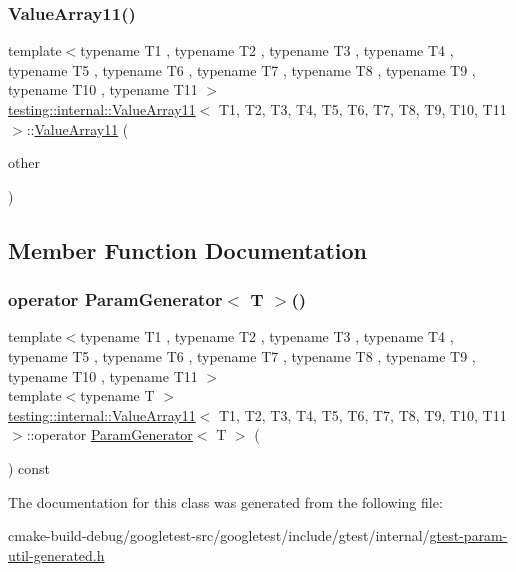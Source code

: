 \subsubsection{\texorpdfstring{ValueArray11()}{ValueArray11()}\hspace{0.1cm}{\footnotesize\ttfamily [2/2]}}
{\footnotesize\ttfamily template$<$typename T1 , typename T2 , typename T3 , typename T4 , typename T5 , typename T6 , typename T7 , typename T8 , typename T9 , typename T10 , typename T11 $>$ \\
\mbox{\hyperlink{classtesting_1_1internal_1_1ValueArray11}{testing\+::internal\+::\+Value\+Array11}}$<$ T1, T2, T3, T4, T5, T6, T7, T8, T9, T10, T11 $>$\+::\mbox{\hyperlink{classtesting_1_1internal_1_1ValueArray11}{Value\+Array11}} (\begin{DoxyParamCaption}\item[{const \mbox{\hyperlink{classtesting_1_1internal_1_1ValueArray11}{Value\+Array11}}$<$ T1, T2, T3, T4, T5, T6, T7, T8, T9, T10, T11 $>$ \&}]{other }\end{DoxyParamCaption})\hspace{0.3cm}{\ttfamily [inline]}}



\subsection{Member Function Documentation}
\mbox{\label{classtesting_1_1internal_1_1ValueArray11_a3042498fcde8d1c91df474e618416f28}} 
\subsubsection{\texorpdfstring{operator ParamGenerator$<$ T $>$()}{operator ParamGenerator< T >()}}
{\footnotesize\ttfamily template$<$typename T1 , typename T2 , typename T3 , typename T4 , typename T5 , typename T6 , typename T7 , typename T8 , typename T9 , typename T10 , typename T11 $>$ \\
template$<$typename T $>$ \\
\mbox{\hyperlink{classtesting_1_1internal_1_1ValueArray11}{testing\+::internal\+::\+Value\+Array11}}$<$ T1, T2, T3, T4, T5, T6, T7, T8, T9, T10, T11 $>$\+::operator \mbox{\hyperlink{classtesting_1_1internal_1_1ParamGenerator}{Param\+Generator}}$<$ T $>$ (\begin{DoxyParamCaption}{ }\end{DoxyParamCaption}) const\hspace{0.3cm}{\ttfamily [inline]}}



The documentation for this class was generated from the following file\+:\begin{DoxyCompactItemize}
\item 
cmake-\/build-\/debug/googletest-\/src/googletest/include/gtest/internal/\mbox{\hyperlink{gtest-param-util-generated_8h}{gtest-\/param-\/util-\/generated.\+h}}\end{DoxyCompactItemize}
